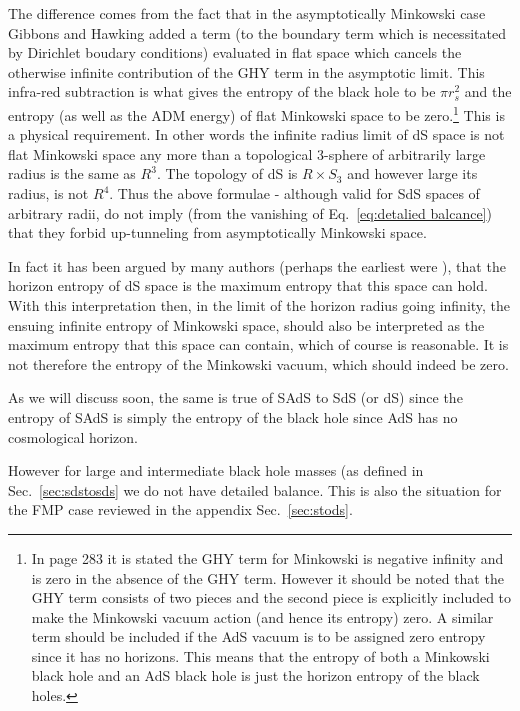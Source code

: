 \documentclass[a4paper,11pt]{article}
\numberwithin{equation}{section}
\newcommand{\citep}{\cite}
\numberwithin{equation}{section}
\begin{document}
The difference comes from the fact that in the asymptotically Minkowski
case Gibbons and Hawking \citep{Gibbons:1976ue} added a term (to
the boundary term which is necessitated by Dirichlet boudary conditions)
evaluated in flat space which cancels the otherwise infinite contribution
of the GHY term in the asymptotic limit. This infra-red subtraction
is what gives the entropy of the black hole to be $\pi r_{s}^{2}$
and the entropy (as well as the ADM energy) of flat Minkowski space
to be zero.\footnote{In \cite{Weinberg:2012pjx} page 283 it is stated the GHY term for Minkowski is negative infinity and is zero in the absence of the GHY term. However it should be noted that the GHY term consists of two pieces and the second piece is explicitly included to make the Minkowski vacuum action (and hence its entropy) zero. A similar term should be included if the AdS vacuum is to be assigned zero entropy since it has no horizons. This means that the entropy of both a Minkowski black hole and an AdS black hole is just the horizon entropy of the black holes.} This is a physical requirement. In other words the infinite
radius limit of dS space is not flat Minkowski space any more than
a topological 3-sphere of arbitrarily large radius is the same as
$R^{3}.$ The topology of dS is $R\times S_{3}$ and however large
its radius, is not $R^{4}$. Thus  the above formulae - although
valid for SdS spaces of arbitrary radii, do not imply (from the vanishing
of Eq.~\eqref{eq:detalied balcance}) that they forbid up-tunneling from
asymptotically Minkowski space. 

In fact it has been argued by many authors (perhaps the earliest were
\cite{Banks:2000fe,fischler2000taking,Fischler:1989se}), that the horizon
entropy of dS space is the maximum entropy that this space can hold.
With this interpretation then, in the limit of the horizon radius
going infinity, the ensuing infinite entropy of Minkowski space, should
also be interpreted as the maximum entropy that this space can contain,
which of course is reasonable. It is not therefore the entropy of
the Minkowski vacuum, which should indeed be zero.

As we will discuss soon, the
same is true of SAdS to SdS (or dS) since the entropy of SAdS is simply
the entropy of the black hole since AdS has no cosmological horizon.

However for large and intermediate black hole masses (as defined in Sec.~\ref{sec:sdstosds} we do not have detailed balance. This is also the situation for the FMP case reviewed in the appendix Sec.~\ref{sec:stods}.
\end{document}
